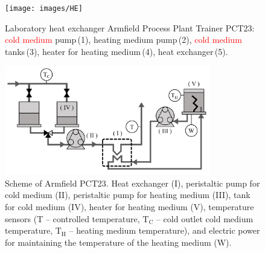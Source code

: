 \documentclass[preprint,12pt]{elsarticle}
\newcommand{\change}[1]{\textcolor{red}{#1}}
\begin{document}
\begin{figure}
	\begin{center}
		\texttt{[image: images/HE]}
		\caption[Heat exchanger Armfield Process Plant Trainer PCT23]{Laboratory heat exchanger Armfield Process Plant Trainer PCT23: \change{cold medium} pump\,(1), heating medium pump\,(2), \change{cold medium} tanks\,(3), heater for heating medium\,(4), heat exchanger\,(5).}
		\label{fig:HE}
	\end{center}
\end{figure}

\begin{figure}
	\begin{center}
		\includegraphics[width=0.8\textwidth]{images/HE_scheme}
		\caption{Scheme of Armfield PCT23. Heat exchanger (I), peristaltic pump for cold medium (II), peristaltic pump for heating medium (III), tank for cold medium (IV), heater for heating medium (V), temperature sensors ($\mathrm{T}$ -- controlled temperature, $\mathrm{T}_\mathrm{C}$ -- cold outlet cold medium temperature, $\mathrm{T}_\mathrm{H}$ -- heating medium temperature), and electric power for maintaining the temperature of the heating medium (W). }
		\label{fig:HE_scheme}
	\end{center}
\end{figure}
\end{document}
